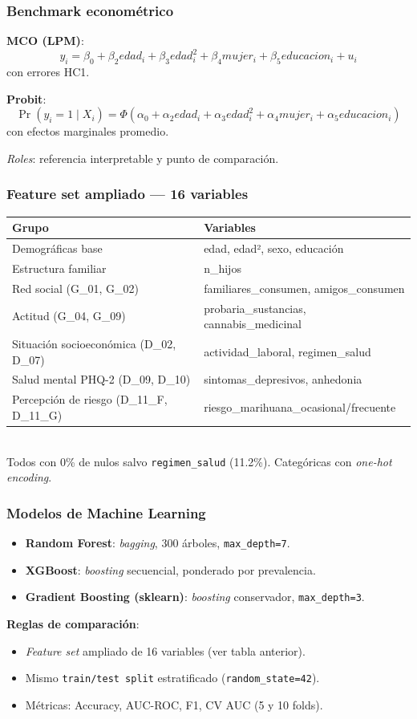 \begin{frame}
\frametitle{Benchmark econométrico}
\textbf{MCO (LPM)}:
\[
y_i = \beta_0 + \beta_2 edad_i + \beta_3 edad_i^2 + \beta_4 mujer_i + \beta_5 educacion_i + u_i
\]
con errores HC1.

\vspace{0.3cm}
\textbf{Probit}:
\[
\Pr(y_i=1\mid X_i) = \Phi(\alpha_0 + \alpha_2 edad_i + \alpha_3 edad_i^2 + \alpha_4 mujer_i + \alpha_5 educacion_i)
\]
con efectos marginales promedio.

\vspace{0.3cm}
\textit{Roles}: referencia interpretable y punto de comparación.
\end{frame}

\begin{frame}
\frametitle{Feature set ampliado — 16 variables}
\centering
\footnotesize
\begin{tabular}{ll}
\toprule
\textbf{Grupo} & \textbf{Variables} \\
\midrule
Demográficas base & edad, edad², sexo, educación \\
Estructura familiar & n\_hijos \\
Red social (G\_01, G\_02) & familiares\_consumen, amigos\_consumen \\
Actitud (G\_04, G\_09) & probaria\_sustancias, cannabis\_medicinal \\
Situación socioeconómica (D\_02, D\_07) & actividad\_laboral, regimen\_salud \\
Salud mental PHQ-2 (D\_09, D\_10) & sintomas\_depresivos, anhedonia \\
Percepción de riesgo (D\_11\_F, D\_11\_G) & riesgo\_marihuana\_ocasional/frecuente \\
\bottomrule
\end{tabular}
\vspace{0.3cm}
\\
\small Todos con 0\% de nulos salvo \texttt{regimen\_salud} (11.2\%). Categóricas con \textit{one-hot encoding}.
\end{frame}

\begin{frame}
\frametitle{Modelos de Machine Learning}
\begin{itemize}
    \item \textbf{Random Forest}: \textit{bagging}, 300 árboles, \texttt{max\_depth=7}.
    \item \textbf{XGBoost}: \textit{boosting} secuencial, ponderado por prevalencia.
    \item \textbf{Gradient Boosting (sklearn)}: \textit{boosting} conservador, \texttt{max\_depth=3}.
\end{itemize}
\vspace{0.3cm}
\textbf{Reglas de comparación}:
\begin{itemize}
    \item \textit{Feature set} ampliado de 16 variables (ver tabla anterior).
    \item Mismo \texttt{train/test split} estratificado (\texttt{random\_state=42}).
    \item Métricas: Accuracy, AUC-ROC, F1, CV AUC (5 y 10 folds).
\end{itemize}
\end{frame}

